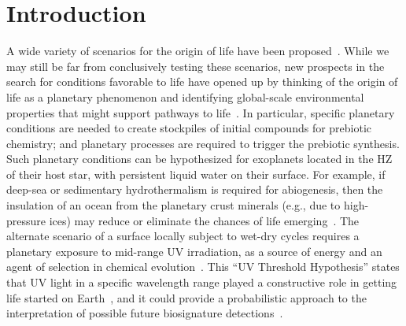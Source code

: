 \documentclass[twocolumn,twocolappendix,linenumbers]{aastex631}
\begin{document}
\section{Introduction}
\label{sec:intro}
A wide variety of scenarios for the origin of life have been proposed~\citep[e.g.,][]{Baross1985,Brasier2011,Mulkidjanian2012,Fox2013,Deamer2015,Westall2018}.
While we may still be far from conclusively testing these scenarios, new prospects in the search for conditions favorable to life have opened up by thinking of the origin of life as a planetary phenomenon and identifying global-scale environmental properties that might support pathways to life~\citep{Sasselov2020}.
In particular, specific planetary conditions are needed to create stockpiles of initial compounds for prebiotic chemistry; and planetary processes are required to trigger the prebiotic synthesis.
Such planetary conditions can be hypothesized for exoplanets located in the \gls{HZ} of their host star, with persistent liquid water on their surface.
For example, if deep-sea or sedimentary hydrothermalism is required for abiogenesis, then the insulation of an ocean from the planetary crust minerals (e.g., due to high-pressure ices) may reduce or eliminate the chances of life emerging~\citep[e.g.,][]{Baross1985}.
The alternate scenario of a surface locally subject to wet-dry cycles requires a planetary exposure to mid-range UV irradiation, as a source of energy and an agent of selection in chemical evolution~\citep[e.g.,][]{Deamer2019}.
This “UV Threshold Hypothesis” states that UV light in a specific wavelength range played a constructive role in getting life started on Earth~\citep{Ranjan2016,Ranjan2017c,Rimmer2018,Rapf2016}, and it could provide a probabilistic approach to the interpretation of possible future biosignature detections~\citep[e.g.,][]{Catling2018,Walker2018}.
\end{document}
